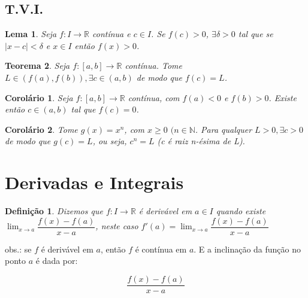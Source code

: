 \documentclass[12pt]{article}
\newtheorem{theorem}{Teorema}[section]
\newtheorem{corollary}{Corolário}[theorem]
\newtheorem{lemma}[theorem]{Lema}
\newtheorem{definition}{Definição}
\begin{document}
\subsection{T.V.I.}
\label{s2}

\begin{lemma} 
    Seja $f: I \rightarrow{} \mathbb{R}$ contínua e $c \in I$. Se $f(c) > 0$, $\exists \delta > 0$ tal que se $|x - c| < \delta$ e $x \in I$ então $f(x) > 0$.
\end{lemma}

\begin{theorem}
    Seja $f: [a, b] \rightarrow{} \mathbb{R}$ contínua. Tome $L \in (f(a), f(b)), \exists c \in (a, b)$ de modo que $f(c) = L$.
\end{theorem}

\begin{corollary}
    Seja $f: [a, b] \rightarrow{} \mathbb{R}$ contínua, com $f(a) < 0$ e $f(b) > 0$. Existe então $c \in (a, b)$ tal que $f(c) = 0$.
\end{corollary}

\begin{corollary}
    Tome $g(x) = x^n$, com $x \geq 0$ $(n \in \mathbb{N}$. Para qualquer $L > 0, \exists c > 0$ de modo que $g(c) = L$, ou seja, $c^n = L$ (c é raiz n-ésima de L).
\end{corollary}

\section{Derivadas e Integrais}
\label{s3}

\begin{definition}
    Dizemos que $f: I \rightarrow{} \mathbb{R}$ é derivável em $a \in I$ quando existe $\lim_{x \rightarrow{} a} \dfrac{f(x) - f(a)}{x-a}$, neste caso $f'(a) = \lim_{x \rightarrow{} a} \dfrac{f(x) - f(a)}{x-a}$
\end{definition}

obs.: se $f$ é derivável em $a$, então $f$ é contínua em $a$. E a inclinação da função no ponto $a$ é dada por:

$$\dfrac{f(x) - f(a)}{x - a}$$
\end{document}
